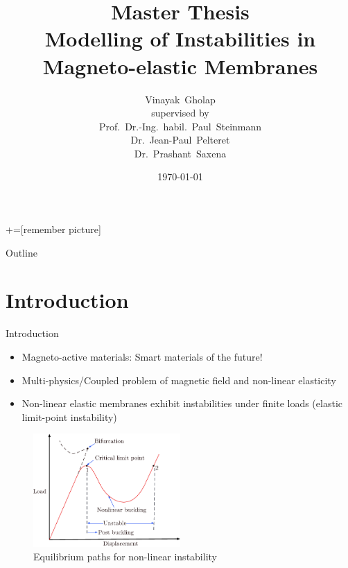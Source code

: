 \documentclass{beamer}
\title[Modelling of Instabilities in MREs]{\small{Master Thesis} \\
\vspace{0.05cm}
\large{Modelling of Instabilities in Magneto-elastic Membranes}}
\author[Vinayak~Gholap]{\footnotesize {Vinayak~Gholap \vspace{0.1cm} \\ supervised by \\Prof.~Dr.-Ing.~habil.~Paul~Steinmann \inst{1}\\Dr.~Jean-Paul~Pelteret \inst{1} \\Dr.~Prashant~Saxena \inst{2}}}
\institute[FAU Erlangen] %
{
  \inst{1}
  Chair of Applied Mechanics\\
  Friedrich-Alexander University Erlangen-N\"urnberg, Germany
  \and
  \inst{2}
  University of Glasgow, UK
}
\date{\today}
\begin{document}
+=[remember picture]

\begin{frame}
  \titlepage
\end{frame}

\begin{frame}{Outline}
  \tableofcontents
\end{frame}

\section{Introduction}
\begin{frame}{Introduction}
\begin{itemize}
\item Magneto-active materials: Smart materials of the future!
\item Multi-physics/Coupled problem of magnetic field and non-linear elasticity
\item Non-linear elastic membranes exhibit instabilities under finite loads (elastic limit-point instability)
\end{itemize}

\begin{figure}[h]
\centering 
\includegraphics[width=0.5\textwidth]{nonlinear_eq_path.pdf}
\caption{Equilibrium paths for non-linear instability}
\end{figure}
\end{frame}
\end{document}
